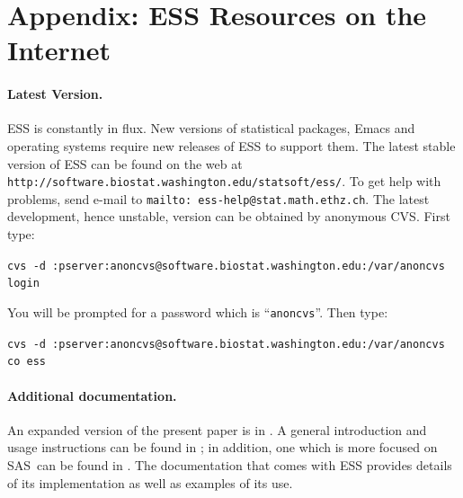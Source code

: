 \documentclass{article}
\def\url#1{\stexttt{#1}} %
\newcommand*{\SAS}{\textsc{SAS}}
\newcommand{\stexttt}[1]{{\small\texttt{#1}}}
\newenvironment{Comment}{\begin{quote}\small\itshape }{\end{quote}}
\begin{document}







\clearpage

\appendix
\section{Appendix: ESS Resources on the Internet}
\label{sec:access}

\paragraph{Latest Version.}

ESS is constantly in flux.  New versions of statistical
packages, Emacs and operating systems require new releases of ESS to
support them.  The latest stable version of ESS can be found on the web at
\url{http://software.biostat.washington.edu/statsoft/ess/}.  To get help
with problems, send e-mail to \url{mailto: ess-help@stat.math.ethz.ch}.
The latest development, hence unstable, version can be obtained by
anonymous CVS.  First type:

\stexttt{cvs -d
  :pserver:anoncvs@software.biostat.washington.edu:/var/anoncvs login}

You will be prompted for a password which is ``\stexttt{anoncvs}''.
Then type:

\stexttt{cvs -d
  :pserver:anoncvs@software.biostat.washington.edu:/var/anoncvs co
  ess}

\paragraph{Additional documentation.}

An expanded version of the present paper is in \citep{RMHHS:2001}.  A
general introduction and usage instructions can be found in
\citep{heiberger:dsc:2001}; in addition, one which is more focused on
\SAS\ can be found in \citep{heiberger:philasugi:2001}.  The
documentation that comes with ESS provides details of its
implementation as well as examples of its use.
\end{document}

